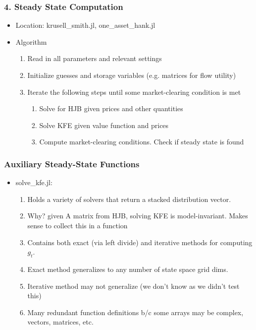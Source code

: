 \documentclass{beamer}
\begin{document}
\begin{frame}
\frametitle{4. Steady State Computation}
\begin{itemize}
\item Location: krusell\_smith.jl, one\_asset\_hank.jl
\item Algorithm
  \begin{enumerate}
  \item Read in all parameters and relevant settings
  \item Initialize guesses and storage variables (e.g. matrices for flow utility)
  \item Iterate the following steps until some market-clearing condition is met
    \begin{enumerate}
    \item Solve for HJB given prices and other quantities
    \item Solve KFE given value function and prices
    \item Compute market-clearing conditions. Check if steady state is found
    \end{enumerate}
  \end{enumerate}
\end{itemize}
\end{frame}
\begin{frame}
\frametitle{Auxiliary Steady-State Functions}
\begin{itemize}
\item solve\_kfe.jl:
  \begin{enumerate}
  \item Holds a variety of solvers that return a stacked distribution vector.
  \item Why? given A matrix from HJB, solving KFE is model-invariant. Makes sense to collect this in a function
  \item Contains both exact (via left divide) and iterative methods for computing $g_t$.
  \item Exact method generalizes to any number of state space grid dims.
  \item Iterative method may not generalize (we don't know as we didn't test this)
  \item Many redundant function definitions b/c some arrays may be complex, vectors, matrices, etc.
  \end{enumerate}
\end{itemize}
\end{frame}
\end{document}
